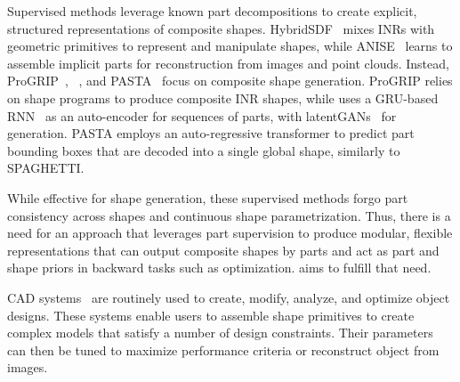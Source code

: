 
Supervised methods leverage known part decompositions to create explicit, structured representations of composite shapes. HybridSDF~\cite{Vasu22} mixes INRs with geometric primitives to represent and manipulate shapes, while ANISE~\cite{Petrov23} learns to assemble implicit parts for reconstruction from images and point clouds. Instead, ProGRIP~\cite{Deng22b}, \PQNET~\cite{Wu20c}, and PASTA~\cite{Li24c} focus on composite shape generation. ProGRIP relies on shape programs to produce composite INR shapes, while \PQNET{} uses a GRU-based RNN~\cite{Cho14b} as an auto-encoder for sequences of parts, with latentGANs~\cite{Achlioptas18b} for generation. PASTA employs an auto-regressive transformer to predict part bounding boxes that are decoded into a single global shape, similarly to SPAGHETTI.

While effective for shape generation, these supervised methods forgo part consistency across shapes and continuous shape parametrization. Thus, there is a need for an approach that leverages part supervision to produce modular, flexible representations that can output composite shapes by parts and act as part and shape priors in backward tasks such as optimization. \PSDF{} aims to fulfill that need.

\iffalse


%

CAD systems~\cite{OnShape,SolidWorks,TopSolid}  are routinely used  to create, modify, analyze, and optimize object designs. These systems enable users to assemble shape primitives to create complex models that satisfy a number of design constraints. Their parameters can then be tuned to maximize performance criteria or reconstruct object from images. 

